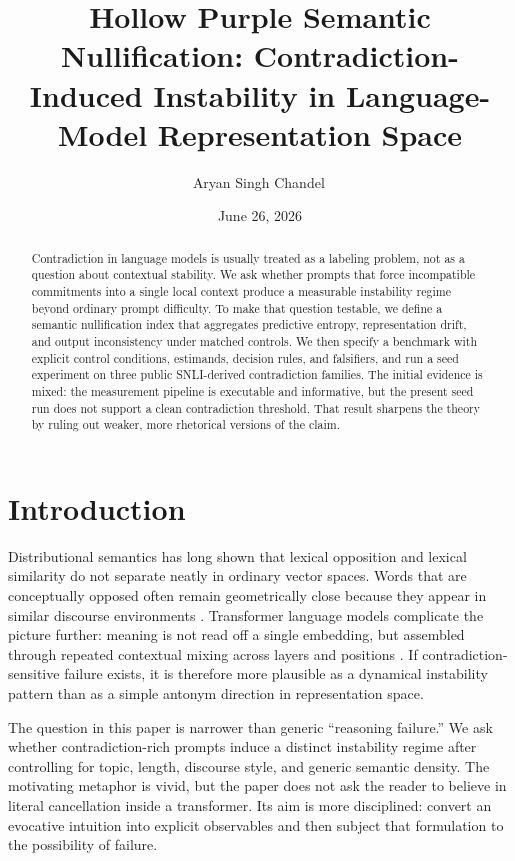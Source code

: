 \documentclass{svjour3}
\title{Hollow Purple Semantic Nullification: Contradiction-Induced Instability in Language-Model Representation Space}
\author{Aryan Singh Chandel\,\orcidlink{0009-0007-1774-2480}}
\institute{Aryan Singh Chandel \at
  RJIT (Rustamji Institute of Technology), Gwalior, India \\
  \email{aryansingh19gh@gmail.com}
}
\date{June 26, 2026}
\begin{document}
\maketitle

\begin{abstract}
Contradiction in language models is usually treated as a labeling problem, not as a question about contextual stability. We ask whether prompts that force incompatible commitments into a single local context produce a measurable instability regime beyond ordinary prompt difficulty. To make that question testable, we define a semantic nullification index that aggregates predictive entropy, representation drift, and output inconsistency under matched controls. We then specify a benchmark with explicit control conditions, estimands, decision rules, and falsifiers, and run a seed experiment on three public SNLI-derived contradiction families. The initial evidence is mixed: the measurement pipeline is executable and informative, but the present seed run does not support a clean contradiction threshold. That result sharpens the theory by ruling out weaker, more rhetorical versions of the claim.
\end{abstract}

\section{Introduction}
Distributional semantics has long shown that lexical opposition and lexical similarity do not separate neatly in ordinary vector spaces. Words that are conceptually opposed often remain geometrically close because they appear in similar discourse environments \citep{hill2015simlex,mrksic2016counterfitting}. Transformer language models complicate the picture further: meaning is not read off a single embedding, but assembled through repeated contextual mixing across layers and positions \citep{vaswani2017attention}. If contradiction-sensitive failure exists, it is therefore more plausible as a dynamical instability pattern than as a simple antonym direction in representation space.

The question in this paper is narrower than generic ``reasoning failure.'' We ask whether contradiction-rich prompts induce a distinct instability regime after controlling for topic, length, discourse style, and generic semantic density. The motivating metaphor is vivid, but the paper does not ask the reader to believe in literal cancellation inside a transformer. Its aim is more disciplined: convert an evocative intuition into explicit observables and then subject that formulation to the possibility of failure.
\end{document}
